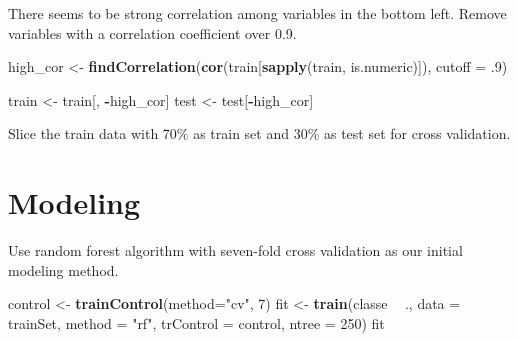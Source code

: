 \documentclass[]{article}
\newenvironment{Shaded}{\begin{snugshade}}{\end{snugshade}}
\newcommand{\KeywordTok}[1]{\textcolor[rgb]{0.13,0.29,0.53}{\textbf{#1}}}
\newcommand{\DataTypeTok}[1]{\textcolor[rgb]{0.13,0.29,0.53}{#1}}
\newcommand{\DecValTok}[1]{\textcolor[rgb]{0.00,0.00,0.81}{#1}}
\newcommand{\FloatTok}[1]{\textcolor[rgb]{0.00,0.00,0.81}{#1}}
\newcommand{\StringTok}[1]{\textcolor[rgb]{0.31,0.60,0.02}{#1}}
\newcommand{\OtherTok}[1]{\textcolor[rgb]{0.56,0.35,0.01}{#1}}
\newcommand{\OperatorTok}[1]{\textcolor[rgb]{0.81,0.36,0.00}{\textbf{#1}}}
\newcommand{\NormalTok}[1]{#1}
\begin{document}
There seems to be strong correlation among variables in the bottom left.
Remove variables with a correlation coefficient over 0.9.

\begin{Shaded}
\begin{Highlighting}[]
\NormalTok{high_cor <-}\StringTok{ }\KeywordTok{findCorrelation}\NormalTok{(}\KeywordTok{cor}\NormalTok{(train[}\KeywordTok{sapply}\NormalTok{(train, is.numeric)]), }\DataTypeTok{cutoff =}\NormalTok{ .}\DecValTok{9}\NormalTok{)}

\NormalTok{train <-}\StringTok{ }\NormalTok{train[, }\OperatorTok{-}\NormalTok{high_cor]}
\NormalTok{test <-}\StringTok{ }\NormalTok{test[}\OperatorTok{-}\NormalTok{high_cor]}
\end{Highlighting}
\end{Shaded}

Slice the train data with 70\% as train set and 30\% as test set for
cross validation.

\begin{Shaded}
\end{Shaded}

\section{Modeling}\label{modeling}

Use random forest algorithm with seven-fold cross validation as our
initial modeling method.

\begin{Shaded}
\begin{Highlighting}[]
\NormalTok{control <-}\StringTok{ }\KeywordTok{trainControl}\NormalTok{(}\DataTypeTok{method=}\StringTok{"cv"}\NormalTok{, }\DecValTok{7}\NormalTok{)}
\NormalTok{fit <-}\StringTok{ }\KeywordTok{train}\NormalTok{(classe }\OperatorTok{~}\StringTok{ }\NormalTok{., }\DataTypeTok{data =}\NormalTok{ trainSet, }\DataTypeTok{method =} \StringTok{"rf"}\NormalTok{, }\DataTypeTok{trControl =}\NormalTok{ control, }\DataTypeTok{ntree =} \DecValTok{250}\NormalTok{)}
\NormalTok{fit}
\end{Highlighting}
\end{Shaded}
\end{document}
